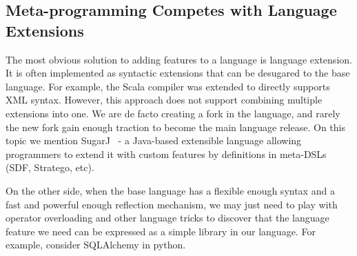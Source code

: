 \begin{comment}
\subsection{Type-Directed Translations/Syntactic Sugar}
\marco{I'm tring to merge this and the next one}
Language extensions are often implemented as syntactic sugar of the base
language. For example, Scala compiler supports XML syntax in normal Scala code
directly (after Scala ?, users need to import \texttt{scala-xml} library
manually). However, this approach is hard in terms of implementation, because it
requires extending the compiler. Also, this approach does not support combining
multiple extensions into one.

SugarJ~\cite{erdweg11sugarj} is a Java-based extensible programming language
that allows programmers to extend the base language with custom language
features by definitions in meta-DSLs (SDF, Stratego, etc). 
\yanlin{Is new syntax really a ``drawback''? I think for some system, like
  SugarJ, one of purpose IS to introduce these new syntax.}  Drawbacks: new
syntax. To create the extension, programmers have to work with multiple
languages (SDF, stratego, etc) while our approach works totally in Java
environment.

We can model certain types of language extensions with annotations 
only, but those extensions do not introduce new syntax: they 
merely do automatic code generation. 
\end{comment}

\subsection{Meta-programming Competes with Language Extensions}
The most obvious solution to adding features to a language is language
extension.  It is often implemented as syntactic extensions that can be
desugared to the base language. For example, the Scala compiler was extended to
directly supports XML syntax. However, this approach does not support combining
multiple extensions into one. We are de facto creating a fork in the language,
and rarely the new fork gain enough traction to become the main language
release.  On this topic we mention SugarJ~\cite{erdweg11sugarj} - a Java-based
extensible language allowing programmers to extend it with custom features by
definitions in meta-DSLs (SDF, Stratego, etc).

On the other side, when the base language has a flexible enough syntax and
a fast and powerful enough reflection mechanism, we may just need to play with
operator overloading and other language tricks to discover that the language
feature we need can be expressed as a simple library in our language. For
example, consider SQLAlchemy in python.

